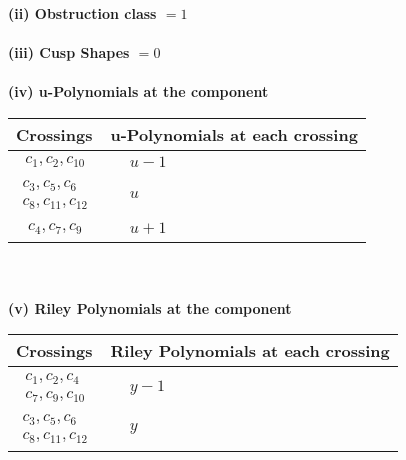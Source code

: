 \documentclass[1p]{elsarticle_modified}
\theoremstyle{definition}
\begin{document}
\flushleft \textbf{(ii) Obstruction class $= 1$}\\~\\
\flushleft \textbf{(iii) Cusp Shapes $= 0$}\\~\\
\newpage\renewcommand{\arraystretch}{1}
\flushleft \textbf{(iv) u-Polynomials at the component}\newline \\
\begin{tabular}{m{50pt}|m{274pt}}
Crossings & \hspace{64pt}u-Polynomials at each crossing \\
\hline $$\begin{aligned}c_{1},c_{2},c_{10}\end{aligned}$$&$\begin{aligned}
&u-1
\end{aligned}$\\
\hline $$\begin{aligned}c_{3},c_{5},c_{6}\\c_{8},c_{11},c_{12}\end{aligned}$$&$\begin{aligned}
&u
\end{aligned}$\\
\hline $$\begin{aligned}c_{4},c_{7},c_{9}\end{aligned}$$&$\begin{aligned}
&u+1
\end{aligned}$\\
\hline
\end{tabular}\\~\\
\newpage\renewcommand{\arraystretch}{1}
\flushleft \textbf{(v) Riley Polynomials at the component}\newline \\
\begin{tabular}{m{50pt}|m{274pt}}
Crossings & \hspace{64pt}Riley Polynomials at each crossing \\
\hline $$\begin{aligned}c_{1},c_{2},c_{4}\\c_{7},c_{9},c_{10}\end{aligned}$$&$\begin{aligned}
&y-1
\end{aligned}$\\
\hline $$\begin{aligned}c_{3},c_{5},c_{6}\\c_{8},c_{11},c_{12}\end{aligned}$$&$\begin{aligned}
&y
\end{aligned}$\\
\hline
\end{tabular}\\~\\
\end{document}
